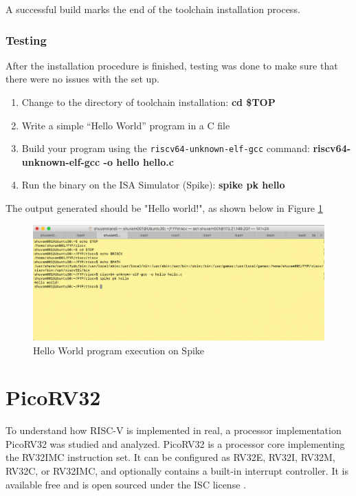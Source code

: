 A successful build marks the end of the toolchain installation process.

\subsubsection{Testing}
\label{sect6_2_2_2}
After the installation procedure is finished, testing was done to make sure that there were no issues with the set up. 
\begin{enumerate}
\item Change to the directory of toolchain installation:\newline
\small \textbf{cd \$TOP}
\item Write a simple “Hello World” program in a C file
\item Build your program using the \verb|riscv64-unknown-elf-gcc| command:\newline
\small \textbf{riscv64-unknown-elf-gcc -o hello hello.c}
\item Run the binary on the ISA Simulator (Spike):\newline
\small \textbf{spike pk hello}
\end{enumerate}

The output generated should be "Hello world!", as shown below in Figure \ref{fig:riscv3} \newline

\begin{figure}[h!]
\includegraphics[width=\linewidth]{figures/Spike_Output.png}
\caption{Hello World program execution on Spike}
\label{fig:riscv3}
\end{figure}

 \section{PicoRV32}
  \label{sect6_3}
To understand how RISC-V is implemented in real, a processor implementation PicoRV32 was studied and analyzed. PicoRV32 is a processor core implementing the RV32IMC instruction set. It can be configured as RV32E, RV32I, RV32M, RV32C, or RV32IMC, and optionally contains a built-in interrupt controller. It is available free and is open sourced under the ISC license \cite{picorv32}. 

